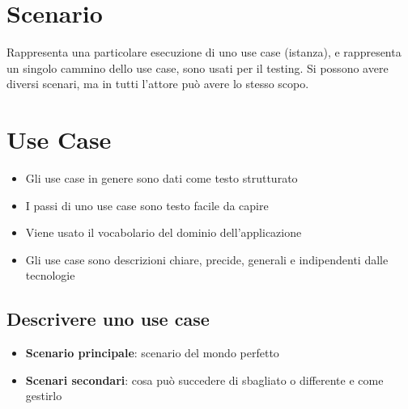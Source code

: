 \documentclass[12pt, a4paper]{report}
\begin{document}
\section{Scenario}
Rappresenta una particolare esecuzione di uno use case (istanza), e rappresenta un singolo cammino dello use case, sono usati per il testing. Si possono avere diversi scenari, ma in tutti l'attore può avere lo stesso scopo.
\section{Use Case}
\begin{itemize}
    \item Gli use case in genere sono dati come testo strutturato
    \item I passi di uno use case sono testo facile da capire
    \item Viene usato il vocabolario del dominio dell'applicazione
    \item Gli use case sono descrizioni chiare, precide, generali e indipendenti dalle tecnologie
\end{itemize}
\subsection{Descrivere uno use case}
\begin{itemize}
    \item \textbf{Scenario principale}: scenario del mondo perfetto
    \item \textbf{Scenari secondari}: cosa può succedere di sbagliato o differente e come gestirlo
\end{itemize}
\end{document}
